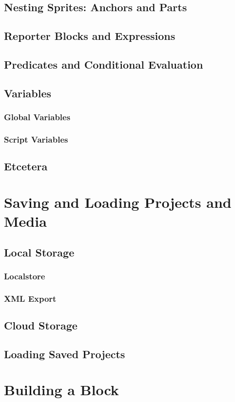 \documentclass{report}
\begin{document}
\section{Nesting Sprites: Anchors and Parts}
\section{Reporter Blocks and Expressions}
\section{Predicates and Conditional Evaluation}
\section{Variables}
\subsection{Global Variables}
\subsection{Script Variables}
\section{Etcetera}
\chapter{Saving and Loading Projects and Media}
\section{Local Storage}
\subsection{Localstore}
\subsection{XML Export}
\section{Cloud Storage}
\section{Loading Saved Projects}
\chapter{Building a Block}
\end{document}
